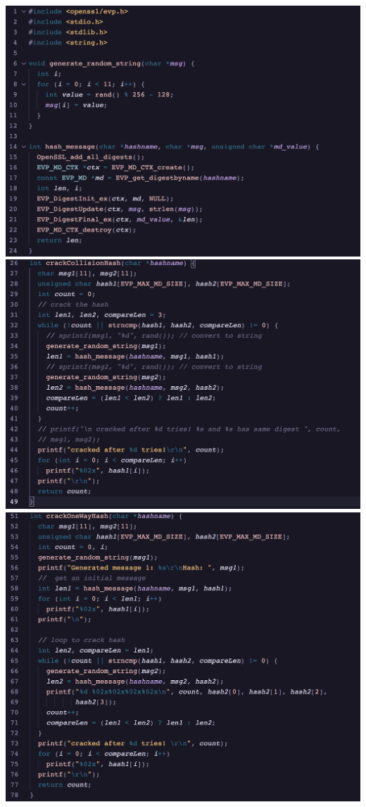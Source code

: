 \documentclass[12pt,largemargins]{homework}
\begin{document}
\begin{center}
    \includegraphics[width=.75\textwidth]{shared.png}
    \includegraphics[width=.75\textwidth]{collision.png}
    \includegraphics[width=.75\textwidth]{oneway.png}
\end{center}
\end{document}
